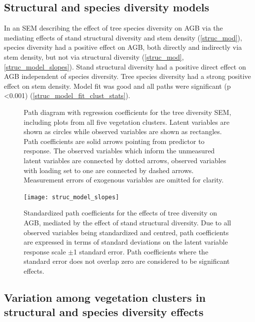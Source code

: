\documentclass[11pt,a4paper]{article}
\begin{document}
\subsection{Structural and species diversity models}

In an SEM describing the effect of tree species diversity on AGB via the mediating effects of stand structural diversity and stem density (\autoref{struc_mod}), species diversity had a positive effect on AGB, both directly and indirectly via stem density, but not via structural diversity (\autoref{struc_mod}, \autoref{struc_model_slopes}). Stand structural diversity had a positive direct effect on AGB independent of species diversity. Tree species diversity had a strong positive effect on stem density. Model fit was good and all paths were significant (p <0.001) (\autoref{struc_model_fit_clust_stats}). 


\begin{figure}[H]
\centering
	
	\caption{Path diagram with regression coefficients for the tree diversity SEM, including plots from all five vegetation clusters. Latent variables are shown as circles while observed variables are shown as rectangles. Path coefficients are solid arrows pointing from predictor to response. The observed variables which inform the unmeasured latent variables are connected by dotted arrows, observed variables with loading set to one are connected by dashed arrows. Measurement errors of exogenous variables are omitted for clarity.}
	\label{struc_mod}
\end{figure}

\begin{figure}[H]
\centering
	\texttt{[image: struc\_model\_slopes]}
	\caption{Standardized path coefficients for the effects of tree diversity on AGB, mediated by the effect of stand structural diversity. Due to all observed variables being standardized and centred, path coefficients are expressed in terms of standard deviations on the latent variable response scale $\pm$1 standard error. Path coefficients where the standard error does not overlap zero are considered to be significant effects.}
	\label{struc_model_slopes}
\end{figure}

\subsection{Variation among vegetation clusters in structural and species diversity effects}
\end{document}
